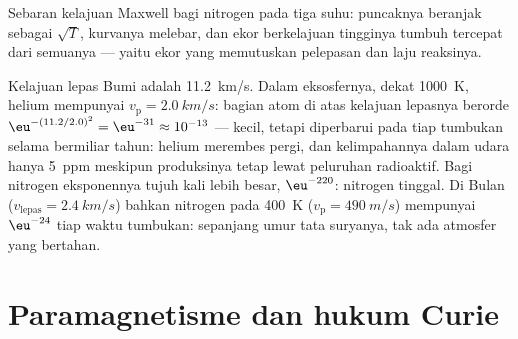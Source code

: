 \begin{omfigure}

{\small Sebaran kelajuan Maxwell bagi nitrogen pada tiga
suhu: puncaknya beranjak sebagai $\sqrt T$, kurvanya melebar, dan
ekor berkelajuan tingginya tumbuh tercepat dari semuanya --- yaitu ekor yang memutuskan pelepasan
dan laju reaksinya.}
\end{omfigure}

\begin{example}\label{ex:b2:boltzmann-factor:escape}
Kelajuan lepas Bumi adalah \qty{11.2}{km/s}. Dalam eksosfernya, dekat
\qty{1000}{K}, helium mempunyai $v_{\text{p}} = \qty{2.0}{km/s}$: bagian
atom di atas kelajuan lepasnya berorde $\eu^{-(11.2/2.0)^2} = \eu^{-31}
\approx 10^{-13}$ --- kecil, tetapi diperbarui pada tiap tumbukan selama bermiliar
tahun: helium merembes pergi, dan kelimpahannya dalam udara hanya
\qty{5}{ppm} meskipun produksinya tetap lewat peluruhan radioaktif. Bagi
nitrogen eksponennya tujuh kali lebih besar, $\eu^{-220}$: nitrogen tinggal.
Di Bulan ($v_{\text{lepas}} = \qty{2.4}{km/s}$) bahkan nitrogen pada
\qty{400}{K} ($v_{\text{p}} = \qty{490}{m/s}$) mempunyai $\eu^{-24}$ tiap waktu tumbukan:
sepanjang umur tata suryanya, tak ada atmosfer yang bertahan.
\end{example}

\section{Paramagnetisme dan hukum Curie}

